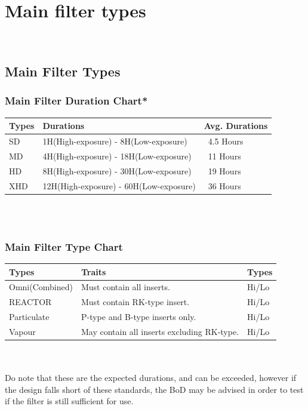 \documentclass[a4paper, 12pt]{article}
\begin{document}
{	\newpage
			
	\section{Main filter types} \-\\
		\subsection{Main Filter Types}
			\subsubsection{Main Filter Duration Chart*}
				\begin{tabular}{|p{1cm}||p{8.44cm}|p{3cm}|}
					\hline
					Types & Durations & Avg. Durations \\\hline
					SD & 1H(High-exposure) - 8H(Low-exposure) &  ~4.5 Hours\\
					MD & 4H(High-exposure) - 18H(Low-exposure) & ~11 Hours \\
					HD & 8H(High-exposure) - 30H(Low-exposure) & ~19 Hours \\
					XHD & 12H(High-exposure) - 60H(Low-exposure) & ~36 Hours \\\hline
				\end{tabular} \\ \-\\
			\subsubsection{Main Filter Type Chart}
				\begin{tabular}{|p{3cm}||p{8.44cm}|p{1cm}|}
					\hline
					Types & Traits & Types \\\hline
					Omni(Combined) & Must contain all inserts. & Hi/Lo \\
					REACTOR & Must contain RK-type insert. & Hi/Lo \\
					Particulate & P-type and B-type inserts only. & Hi/Lo \\
					Vapour & May contain all inserts excluding RK-type. & Hi/Lo \\\hline	
				\end{tabular} \\ \-\\
				\small *Do note that these are the expected durations, and can be exceeded, however if the design falls short of these standards, the BoD may be advised in order to test if the filter is still sufficient for use. \normalsize
}
\end{document}
